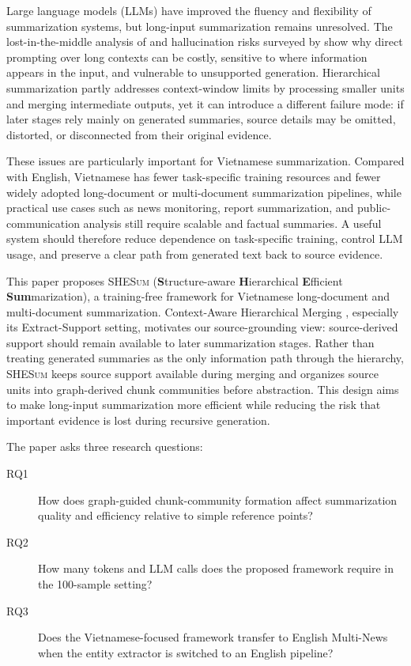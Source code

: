 \documentclass[11pt]{article}
\newcommand{\methodname}{\textsc{SHESum}}
\begin{document}
Large language models (LLMs) have improved the fluency and flexibility of summarization systems, but long-input summarization remains unresolved. The lost-in-the-middle analysis of \citet{liu2023lostmiddlelanguagemodels} and hallucination risks surveyed by \citet{pulkundwar2025concisereviewhallucinationsllms} show why direct prompting over long contexts can be costly, sensitive to where information appears in the input, and vulnerable to unsupported generation. Hierarchical summarization partly addresses context-window limits by processing smaller units and merging intermediate outputs, yet it can introduce a different failure mode: if later stages rely mainly on generated summaries, source details may be omitted, distorted, or disconnected from their original evidence.

These issues are particularly important for Vietnamese summarization. Compared with English, Vietnamese has fewer task-specific training resources and fewer widely adopted long-document or multi-document summarization pipelines, while practical use cases such as news monitoring, report summarization, and public-communication analysis still require scalable and factual summaries. A useful system should therefore reduce dependence on task-specific training, control LLM usage, and preserve a clear path from generated text back to source evidence.

This paper proposes \methodname{} (\textbf{S}tructure-aware \textbf{H}ierarchical \textbf{E}fficient \textbf{Sum}marization), a training-free framework for Vietnamese long-document and multi-document summarization. Context-Aware Hierarchical Merging \citep{ou-lapata-2025-hierarchical}, especially its Extract-Support setting, motivates our source-grounding view: source-derived support should remain available to later summarization stages. Rather than treating generated summaries as the only information path through the hierarchy, \methodname{} keeps source support available during merging and organizes source units into graph-derived chunk communities before abstraction. This design aims to make long-input summarization more efficient while reducing the risk that important evidence is lost during recursive generation.

The paper asks three research questions:

\begin{description}
    \item[RQ1] How does graph-guided chunk-community formation affect summarization quality and efficiency relative to simple reference points?
    \item[RQ2] How many tokens and LLM calls does the proposed framework require in the 100-sample setting?
    \item[RQ3] Does the Vietnamese-focused framework transfer to English Multi-News when the entity extractor is switched to an English pipeline?
\end{description}
\end{document}
